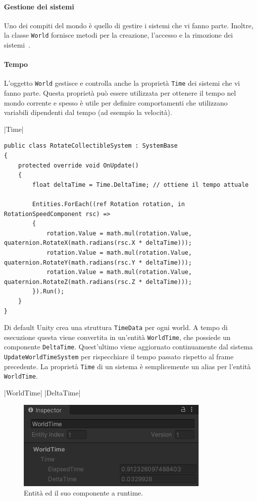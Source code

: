 \paragraph{Gestione dei sistemi}
Uno dei compiti del mondo è quello di gestire i sistemi che vi fanno parte. Inoltre, la classe \verb|World| fornisce metodi per la creazione, l'accesso e la rimozione dei sistemi~\cite{doc:unity-entities-api}.

\paragraph{Tempo}
L'oggetto \verb|World| gestisce e controlla anche la proprietà \verb|Time| dei sistemi che vi fanno parte. Questa proprietà può essere utilizzata per ottenere il tempo nel mondo corrente e spesso è utile per definire comportamenti che utilizzano variabili dipendenti dal tempo (ad esempio la velocità).

|Time|

\begin{lstlisting}[caption={Prototipo: utilizzo della proprietà \UseVerb{TimeTerm} per ruotare delle entità.},label={lst:time-property-example},language={[Sharp]C}]
public class RotateCollectibleSystem : SystemBase
{
    protected override void OnUpdate()
    {
        float deltaTime = Time.DeltaTime; // ottiene il tempo attuale

        Entities.ForEach((ref Rotation rotation, in RotationSpeedComponent rsc) =>
        {
            rotation.Value = math.mul(rotation.Value, quaternion.RotateX(math.radians(rsc.X * deltaTime)));
            rotation.Value = math.mul(rotation.Value, quaternion.RotateY(math.radians(rsc.Y * deltaTime)));
            rotation.Value = math.mul(rotation.Value, quaternion.RotateZ(math.radians(rsc.Z * deltaTime)));
        }).Run();
    }
}
\end{lstlisting}

Di default Unity crea una struttura \verb|TimeData| per ogni world. A tempo di esecuzione questa viene convertita in un'entità \verb|WorldTime|, che possiede un componente \verb|DeltaTime|. Quest'ultimo viene aggiornato continuamente dal sistema \verb|UpdateWorldTimeSystem| per rispecchiare il tempo passato rispetto al frame precedente. La proprietà \verb|Time| di un sistema è semplicemente un alias per l'entità \verb|WorldTime|.

|WorldTime|
|DeltaTime|

\begin{figure}[!ht]
    \centering
    \includegraphics[width=0.65\columnwidth]{gfx/imgs/chapter2/WorldTimeEntity.png}
    \caption{Entità  ed il suo componente  a runtime.}
    \label{fig:worldtime-entity}
\end{figure}


